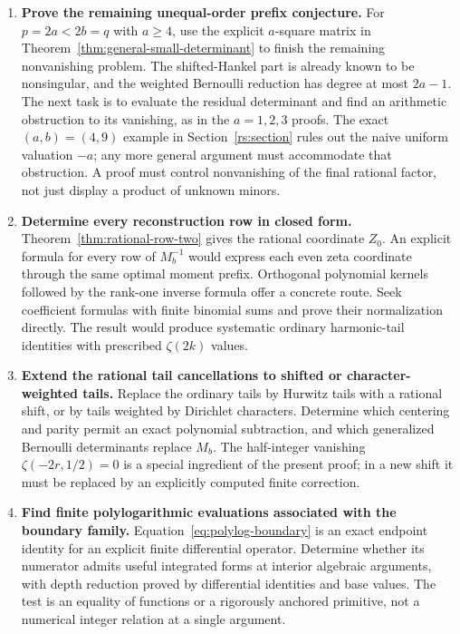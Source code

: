 \begin{enumerate}[leftmargin=*,label=\textbf{R\arabic*.}]
\item \textbf{Prove the remaining unequal-order prefix conjecture.}
For $p=2a<2b=q$ with $a\ge4$, use the explicit $a$-square matrix
in Theorem~\ref{thm:general-small-determinant} to finish the remaining
nonvanishing problem. The shifted-Hankel part is already known to be
nonsingular, and the weighted Bernoulli reduction has degree at most
$2a-1$. The next task is to evaluate the residual determinant and find
an arithmetic obstruction to its vanishing, as in the $a=1,2,3$ proofs. The exact $(a,b)=(4,9)$ example
in Section~\ref{rs:section} rules out the naive uniform valuation $-a$;
any more general argument must accommodate that obstruction.
A proof must control
nonvanishing of the final rational factor, not just display a product of
unknown minors.

\item \textbf{Determine every reconstruction row in closed form.}
Theorem~\ref{thm:rational-row-two} gives the rational coordinate $Z_0$.
An explicit formula for every row of $M_b^{-1}$ would express each even
zeta coordinate through the same optimal moment prefix. Orthogonal
polynomial kernels followed by the rank-one inverse formula offer a
concrete route. Seek coefficient formulas with finite binomial sums and
prove their normalization directly. The result would produce systematic
ordinary harmonic-tail identities with prescribed $\zeta(2k)$ values.

\item \textbf{Extend the rational tail cancellations to shifted or
character-weighted tails.}
Replace the ordinary tails by Hurwitz tails with a rational shift, or
by tails weighted by Dirichlet characters. Determine which centering and
parity permit an exact polynomial subtraction, and which generalized
Bernoulli determinants replace $M_b$. The half-integer vanishing
$\zeta(-2r,1/2)=0$ is a special ingredient of the present proof; in a new
shift it must be replaced by an explicitly computed finite correction.

\item \textbf{Find finite polylogarithmic evaluations associated with
the boundary family.}
Equation~\eqref{eq:polylog-boundary} is an exact endpoint identity for
an explicit finite differential operator. Determine whether its numerator
admits useful integrated forms at interior algebraic arguments, with
depth reduction proved by differential identities and base values.
The test is an equality of functions or a rigorously anchored primitive,
not a numerical integer relation at a single argument.


\end{enumerate}
